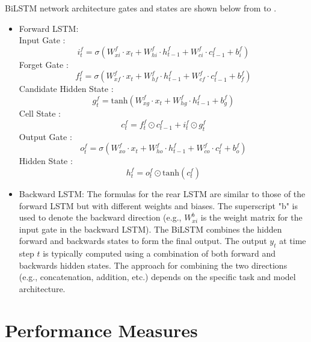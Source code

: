BiLSTM network architecture gates and states are shown below from  to .\\
\begin{itemize}
  \item  Forward LSTM: \\
  Input Gate : 
    \begin{equation} \label{bi i}
    i_t^f = \sigma(W_{xi}^f \cdot x_t + W_{hi}^f \cdot h_{t-1}^f + W_{ci}^f \cdot c_{t-1}^f + b_i^f)
    \end{equation}
    Forget Gate : 
    \begin{equation}
      f_t^f = \sigma(W_{xf}^f \cdot x_t + W_{hf}^f \cdot h_{t-1}^f + W_{cf}^f \cdot c_{t-1}^f + b_f^f) 
    \end{equation}
    Candidate Hidden State :
    \begin{equation}
        g_t^f = \text{tanh}(W_{xg}^f \cdot x_t + W_{hg}^f \cdot h_{t-1}^f + b_g^f)
    \end{equation}
    Cell State : 
    \begin{equation}
      c_t^f = f_t^f \odot c_{t-1}^f + i_t^f \odot g_t^f
    \end{equation}
    Output Gate : 
    \begin{equation}
   o_t^f = \sigma(W_{xo}^f \cdot x_t + W_{ho}^f \cdot h_{t-1}^f + W_{co}^f \cdot c_t^f + b_o^f)
    \end{equation}
    Hidden State : 
    \begin{equation} \label{bi h}
    h_t^f = o_t^f \odot \text{tanh}(c_t^f) 
    \end{equation}

  \item Backward LSTM: 
  The formulas for the rear LSTM are similar to those of the forward LSTM but with different weights and biases. The superscript "b" is used to denote the backward direction (e.g.,  \(W_{xi}^b\) is the weight matrix for the input gate in the backward LSTM). The BiLSTM combines the hidden forward and backwards states to form the final output. The output \(y_t\) at time step \(t\) is typically computed using a combination of both forward and backwards hidden states. The approach for combining the two directions (e.g.,  concatenation,  addition,  etc.) depends on the specific task and model architecture.
\end{itemize}

\section{ Performance Measures}
